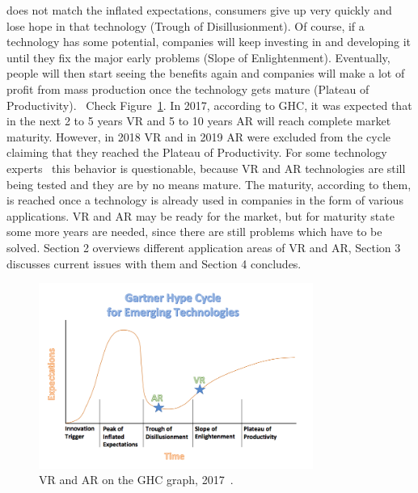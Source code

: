\documentclass[12pt]{article}
\begin{document}
does not match the inflated expectations, consumers give up very quickly and lose hope in that technology (Trough of Disillusionment). Of course, if a technology has some potential, companies will keep investing in and developing it until they fix the major early problems (Slope of Enlightenment). Eventually, people will then start seeing the benefits again and companies will make a lot of profit from mass production once the technology gets mature (Plateau of Productivity).~\cite{gartnerPrediction} Check Figure~\ref{fig:gartnerCycle}. In 2017, according to \ac{GHC}, it was expected that in the next 2 to 5 years \ac{VR} and 5 to 10 years \ac{AR} will reach complete market maturity. However, in 2018 \ac{VR} and in 2019 \ac{AR} were excluded from the cycle claiming that they reached the Plateau of Productivity. For some technology experts~\cite{gartnerCounter} this behavior is questionable, because \ac{VR} and \ac{AR} technologies are still being tested and they are by no means mature. The maturity, according to them, is reached once a technology is already used in companies in the form of various applications. \ac{VR} and \ac{AR} may be ready for the market, but for maturity state some more years are needed, since there are still problems which have to be solved. Section 2 overviews different application areas of \ac{VR} and \ac{AR}, Section 3 discusses current issues with them and Section 4 concludes. 

\begin{figure} [ht]
    \centering
    \includegraphics[width=0.80\textwidth]{../images/Gartner.png}
    \caption{\ac{VR} and \ac{AR} on the \ac{GHC} graph, 2017~\cite{gartnerPrediction}.}
    \label{fig:gartnerCycle}
\end{figure}

\end{document}
